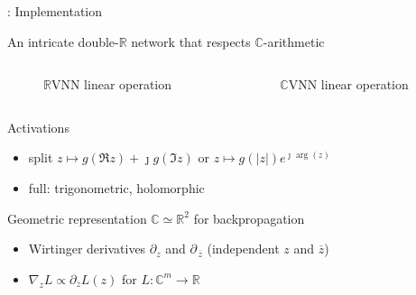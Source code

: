 \documentclass{beamer}
\newcommand{\real}{\mathbb{R}}
\newcommand{\cplx}{\mathbb{C}}
\newcommand{\conj}[1]{\overline{#1}}
\newcommand{\iu}{{\jmath}}
\begin{document}
\begin{frame}[c]{\insertsection: Implementation}

  An intricate double-$\real$ network that respects $\cplx$-arithmetic
  \vspace{-1em}
  \begin{columns}[T]
    \begin{column}{0.45\linewidth}
      \begin{figure}
          
        {$\real$VNN linear operation}
      \end{figure}
    \end{column}%
    \begin{column}{0.45\linewidth}
      \begin{figure}
          
        {$\cplx$VNN linear operation}
      \end{figure}
    \end{column}
  \end{columns}

  \bigskip
  Activations
  \begin{itemize}
    \item split $
      z \mapsto g(\Re{z}) + \iu g(\Im{z}) %
    $ or $
      z \mapsto g(\lvert z\rvert) e^{\iu \arg{\!(z)}}
    $ %
    \item full: trigonometric, holomorphic
  \end{itemize}

  \smallskip
  Geometric representation $\cplx \simeq \real^2$ for backpropagation
  \begin{itemize}
    \item Wirtinger derivatives $
        \partial_z
      $ and $
        \partial_{\,\conj{z}}
      $ (independent $z$ and ${\conj{z}}$)
    \item $\nabla_z L \propto \partial_{\conj{z}} L(z)$ for $L\colon \cplx^m \to \real$
  \end{itemize}
\end{frame}
\end{document}
